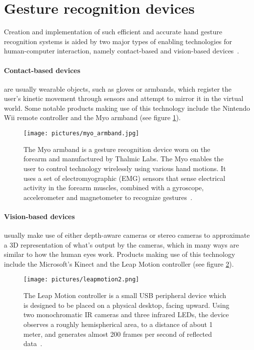 \section{Gesture recognition devices}
Creation and implementation of such efficient and
accurate hand gesture recognition systems is aided by two major types of enabling
technologies for human-computer interaction, namely contact-based and vision-based devices~\citep{Rautaray2015}. 

\paragraph{Contact-based devices} are usually wearable objects, such as gloves or armbands, 
which register the user's kinetic movement through sensors and attempt to mirror it in the virtual world. 
Some notable products making use of this technology include the Nintendo Wii remote controller and the Myo armband (see figure \ref{fig:myo}). 

\begin{figure}%
	\texttt{[image: pictures/myo\_armband.jpg]}
	\caption{The Myo armband is a gesture recognition device worn on the forearm and manufactured by Thalmic Labs. The Myo enables the user to control technology wirelessly using various hand motions. It uses a set of electromyographic (EMG) sensors that sense electrical activity in the forearm muscles, combined with a gyroscope, accelerometer and magnetometer to recognize gestures~\citep{Myo2015}.}
	\label{fig:myo}
\end{figure}

\paragraph{Vision-based devices} usually make use of either depth-aware cameras or stereo cameras to approximate a 3D representation of what's output by the cameras, which in many ways are similar to how the human eyes work. Products making use of this technology include the Microsoft's Kinect and the Leap Motion controller (see figure \ref{fig:leapmotion}). 

\begin{figure}%
	\texttt{[image: pictures/leapmotion2.png]}
	\caption{The Leap Motion controller is a small USB peripheral device which is designed to be placed on a physical desktop, facing upward. Using two monochromatic IR cameras and three infrared LEDs, the device observes a roughly hemispherical area, to a distance of about 1 meter, and generates almost 200 frames per second of reflected data~\citep{LeapMotion2016}.}
	\label{fig:leapmotion}
\end{figure} 

